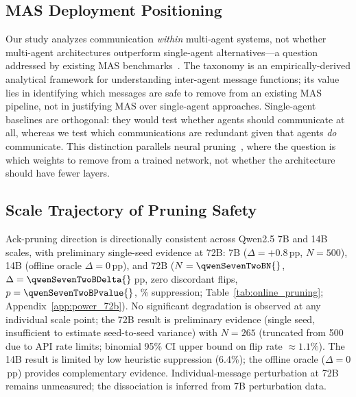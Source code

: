 \subsection{MAS Deployment Positioning}

Our study analyzes communication \emph{within} multi-agent systems, not whether multi-agent architectures outperform single-agent alternatives---a question addressed by existing MAS benchmarks~\cite{du_protocolbench_2025, zhu_multiagentbench_2025}. The taxonomy is an empirically-derived analytical framework for understanding inter-agent message functions; its value lies in identifying which messages are safe to remove from an existing MAS pipeline, not in justifying MAS over single-agent approaches. Single-agent baselines are orthogonal: they would test whether agents should communicate at all, whereas we test which communications are redundant given that agents \emph{do} communicate. This distinction parallels neural pruning~\cite{lecun_obd_1990}, where the question is which weights to remove from a trained network, not whether the architecture should have fewer layers.

\subsection{Scale Trajectory of Pruning Safety}

Ack-pruning direction is directionally consistent across Qwen2.5 7B and 14B scales, with preliminary single-seed evidence at 72B: 7B ($\Delta = +0.8$\,pp, $N = 500$), 14B (offline oracle $\Delta = 0$\,pp), and 72B ($N = \qwenSevenTwoBN{}$, $\Delta = \qwenSevenTwoBDelta{}$\,pp, zero discordant flips, $p = \qwenSevenTwoBPvalue{}$, \qwenSevenTwoBSupp{}\% suppression; Table~\ref{tab:online_pruning}; Appendix~\ref{app:power_72b}). No significant degradation is observed at any individual scale point; the 72B result is preliminary evidence (single seed, insufficient to estimate seed-to-seed variance) with $N = 265$ (truncated from 500 due to API rate limits; binomial 95\% CI upper bound on flip rate $\approx 1.1\%$).
The 14B result is limited by low heuristic suppression (6.4\%); the offline oracle ($\Delta = 0$\,pp) provides complementary evidence.
Individual-message perturbation at 72B remains unmeasured; the dissociation is inferred from 7B perturbation data.
